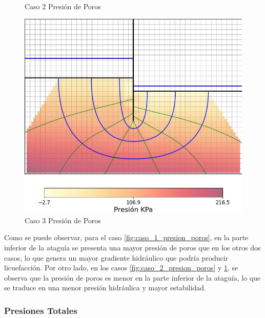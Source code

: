 \begin{figure}[H]
\begin{minipage}{0.32\textwidth}
        \caption{Caso 2 Presión de Poros}
        \label{fig:caso_2_presion_poros}
    \end{minipage}
    \begin{minipage}{0.32\textwidth}
        \centering
        \includegraphics[width=\textwidth]{GRAFICOS/caso_3_presion_poros.jpg}
        \caption{Caso 3 Presión de Poros}
        \label{fig:caso_3_presion_poros}
    \end{minipage}
\end{figure}

Como se puede observar, para el caso \ref{fig:caso_1_presion_poros}, en la parte inferior de la ataguía se presenta una mayor presión de poros que en los otros dos casos, lo que genera un mayor gradiente hidráulico que podría producir licuefacción. Por otro lado, en los casos \ref{fig:caso_2_presion_poros} y \ref{fig:caso_3_presion_poros}, se observa que la presión de poros es menor en la parte inferior de la ataguía, lo que se traduce en una menor presión hidráulica y mayor estabilidad.

\subsubsection{Presiones Totales}

